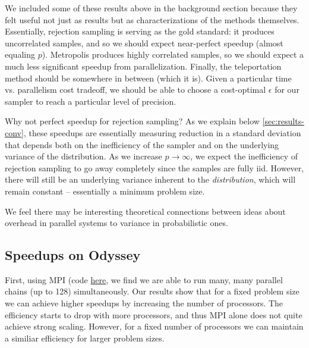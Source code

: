 \documentclass{article}
\begin{document}
We included some of these results above in the background section because they
felt useful not just as results but as characterizations of the methods
themselves. Essentially, rejection sampling is serving as the gold standard: it
produces uncorrelated samples, and so we should expect near-perfect speedup
(almost equaling $p$). Metropolis produces highly correlated samples, so we
should expect a much less significant speedup from parallelization. Finally,
the teleportation method should be somewhere in between (which it is). Given a
particular time vs. parallelism cost tradeoff, we should be able to choose a
cost-optimal $\epsilon$ for our sampler to reach a particular level of
precision.

Why not perfect speedup for rejection sampling? As we explain
below \ref{sec:results-conv}, these speedups are essentially measuring reduction in a
standard deviation that depends both on the inefficiency of the sampler and on
the underlying variance of the distribution. As we increase $p\to\infty$,
we expect the inefficiency of rejection sampling to go away completely since
the samples are fully iid. However, there will still be an underlying variance
inherent to the \textit{distribution}, which will remain constant -- essentially a
minimum problem size.

We feel there may be interesting theoretical connections between ideas about
overhead in parallel systems to variance in probabilistic ones.

\subsection{Speedups on Odyssey}

First, using MPI (code
\href{https://github.com/asross/cs205-project/blob/master/odyssey_setup/mpi_mcmc/mpi_mcmc.py}{here},
we find we are able to run many, many parallel chains (up to 128)
simultaneously. Our results show that for a fixed problem size we can achieve
higher speedups by increasing the number of processors. The efficiency starts
to drop with more processors, and thus MPI alone does not quite achieve strong
scaling. However, for a fixed number of processors we can maintain a similiar
efficiency for larger problem sizes.
\end{document}
